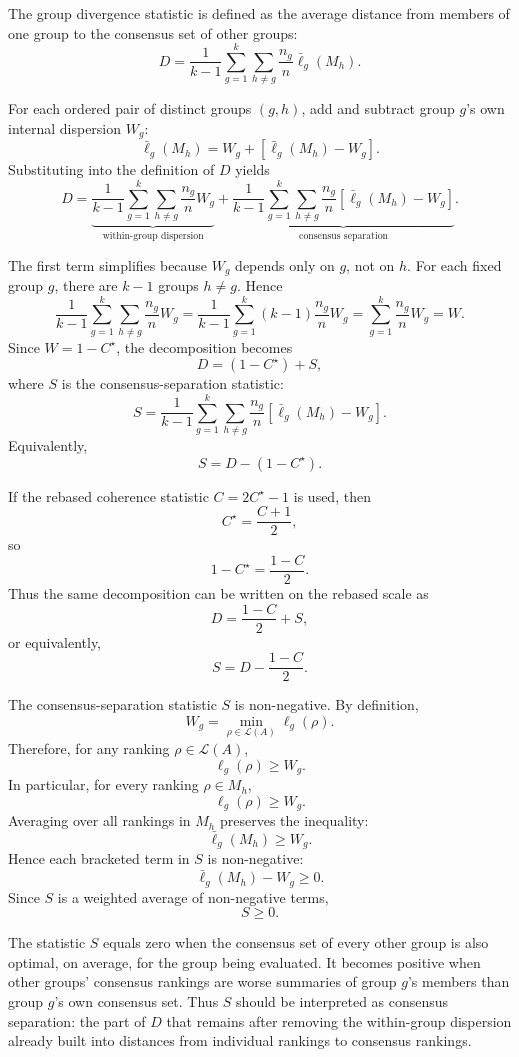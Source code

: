 \documentclass[12pt]{article}
\begin{document}
The group divergence statistic is defined as the average distance from members
of one group to the consensus set of other groups:
\[
D
=
\frac{1}{k-1}
\sum_{g=1}^{k}
\sum_{h\neq g}
\frac{n_g}{n}
\bar{\ell}_g(M_h).
\]

For each ordered pair of distinct groups \((g,h)\), add and subtract group
\(g\)'s own internal dispersion \(W_g\):
\[
\bar{\ell}_g(M_h)
=
W_g
+
\left[
\bar{\ell}_g(M_h)-W_g
\right].
\]
Substituting into the definition of \(D\) yields
\[
D
=
\underbrace{
\frac{1}{k-1}
\sum_{g=1}^{k}
\sum_{h\neq g}
\frac{n_g}{n}W_g
}_{\text{within-group dispersion}}
+
\underbrace{
\frac{1}{k-1}
\sum_{g=1}^{k}
\sum_{h\neq g}
\frac{n_g}{n}
\left[
\bar{\ell}_g(M_h)-W_g
\right]
}_{\text{consensus separation}}.
\]

The first term simplifies because \(W_g\) depends only on \(g\), not on \(h\).
For each fixed group \(g\), there are \(k-1\) groups \(h\neq g\). Hence
\[
\frac{1}{k-1}
\sum_{g=1}^{k}
\sum_{h\neq g}
\frac{n_g}{n}W_g
=
\frac{1}{k-1}
\sum_{g=1}^{k}
(k-1)
\frac{n_g}{n}W_g
=
\sum_{g=1}^{k}
\frac{n_g}{n}W_g
=
W.
\]
Since \(W=1-C^\star\), the decomposition becomes
\[
D
=
(1-C^\star)
+
S,
\]
where \(S\) is the consensus-separation statistic:
\[
S
=
\frac{1}{k-1}
\sum_{g=1}^{k}
\sum_{h\neq g}
\frac{n_g}{n}
\left[
\bar{\ell}_g(M_h)-W_g
\right].
\]
Equivalently,
\[
S
=
D-(1-C^\star).
\]

If the rebased coherence statistic \(C=2C^\star-1\) is used, then
\[
C^\star
=
\frac{C+1}{2},
\]
so
\[
1-C^\star
=
\frac{1-C}{2}.
\]
Thus the same decomposition can be written on the rebased scale as
\[
D
=
\frac{1-C}{2}
+
S,
\]
or equivalently,
\[
S
=
D-\frac{1-C}{2}.
\]

The consensus-separation statistic \(S\) is non-negative. By definition,
\[
W_g
=
\min_{\rho \in \mathcal{L}(A)} \ell_g(\rho).
\]
Therefore, for any ranking \(\rho \in \mathcal{L}(A)\),
\[
\ell_g(\rho)\ge W_g.
\]
In particular, for every ranking \(\rho \in M_h\),
\[
\ell_g(\rho)\ge W_g.
\]
Averaging over all rankings in \(M_h\) preserves the inequality:
\[
\bar{\ell}_g(M_h)\ge W_g.
\]
Hence each bracketed term in \(S\) is non-negative:
\[
\bar{\ell}_g(M_h)-W_g\ge 0.
\]
Since \(S\) is a weighted average of non-negative terms,
\[
S\ge 0.
\]

The statistic \(S\) equals zero when the consensus set of every other group is
also optimal, on average, for the group being evaluated. It becomes positive
when other groups' consensus rankings are worse summaries of group \(g\)'s
members than group \(g\)'s own consensus set. Thus \(S\) should be interpreted
as consensus separation: the part of \(D\) that remains after removing the
within-group dispersion already built into distances from individual rankings
to consensus rankings.
\end{document}
